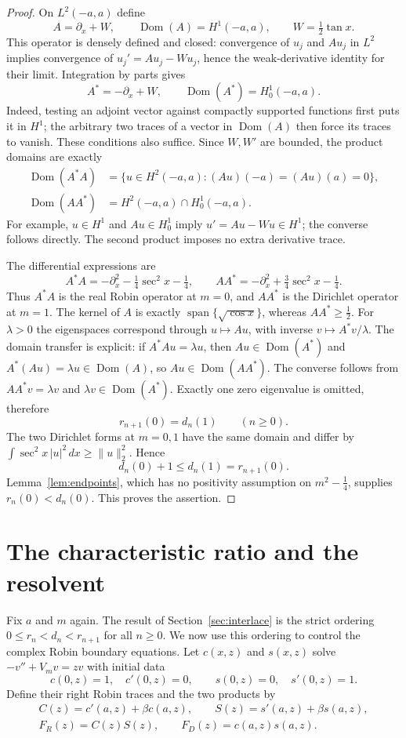 \documentclass[11pt]{article}
\newcommand{\norm}[1]{\lVert#1\rVert}
\DeclareMathOperator{\Dom}{Dom}
\begin{document}
\begin{proof}
On $L^2(-a,a)$ define
\[
 A=\partial_x+W,\qquad\Dom(A)=H^1(-a,a),\qquad W=\tfrac12\tan x.
\]
This operator is densely defined and closed: convergence of $u_j$ and
$Au_j$ in $L^2$ implies convergence of $u_j'=Au_j-Wu_j$, hence the
weak-derivative identity for their limit. Integration by parts gives
\[
 A^*=-\partial_x+W,\qquad\Dom(A^*)=H^1_0(-a,a).
\]
Indeed, testing an adjoint vector against compactly supported functions
first puts it in $H^1$; the arbitrary two traces of a vector in
$\Dom(A)$ then force its traces to vanish. These conditions also suffice.
Since $W,W'$ are bounded, the product domains are exactly
\begin{align*}
 \Dom(A^*A)&=\{u\in H^2(-a,a):(Au)(-a)=(Au)(a)=0\},\\
 \Dom(AA^*)&=H^2(-a,a)\cap H^1_0(-a,a).
\end{align*}
For example, $u\in H^1$ and $Au\in H^1_0$ imply
$u'=Au-Wu\in H^1$; the converse follows directly. The second product
imposes no extra derivative trace.

The differential expressions are
\[
 A^*A=-\partial_x^2-\tfrac14\sec^2x-\tfrac14,\qquad
 AA^*=-\partial_x^2+\tfrac34\sec^2x-\tfrac14.
\]
Thus $A^*A$ is the real Robin operator at $m=0$, and $AA^*$ is the
Dirichlet operator at $m=1$. The kernel of $A$ is exactly
$\operatorname{span}\{\sqrt{\cos x}\}$, whereas $AA^*\geq\tfrac12$.
For $\lambda>0$ the eigenspaces correspond through $u\mapsto Au$,
with inverse $v\mapsto A^*v/\lambda$. The domain transfer is explicit:
if $A^*Au=\lambda u$, then $Au\in\Dom(A^*)$ and
$A^*(Au)=\lambda u\in\Dom(A)$, so $Au\in\Dom(AA^*)$.
The converse follows from $AA^*v=\lambda v$ and
$\lambda v\in\Dom(A^*)$. Exactly one zero eigenvalue is omitted,
therefore
\[
 r_{n+1}(0)=d_n(1)\qquad(n\geq0).
\]
The two Dirichlet forms at $m=0,1$ have the same domain and differ by
$\int\sec^2x\,|u|^2\,dx\geq\norm{u}_2^2$. Hence
\[
 d_n(0)+1\leq d_n(1)=r_{n+1}(0).
\]
Lemma~\ref{lem:endpoints}, which has no positivity assumption on
$m^2-\tfrac14$, supplies $r_n(0)<d_n(0)$. This proves the assertion.
\end{proof}

\section{The characteristic ratio and the resolvent}\label{sec:resolvent}

Fix $a$ and $m$ again. The result of Section~\ref{sec:interlace} is the
strict ordering $0\leq r_n<d_n<r_{n+1}$ for all $n\geq0$.
We now use this ordering to control the complex Robin boundary equations.
Let $c(x,z)$ and $s(x,z)$ solve $-v''+V_mv=zv$ with initial data
\[
 c(0,z)=1,\quad c'(0,z)=0,\qquad s(0,z)=0,\quad s'(0,z)=1.
\]
Define their right Robin traces and the two products by
\[
 \begin{gathered}
 C(z)=c'(a,z)+\beta c(a,z),\qquad
 S(z)=s'(a,z)+\beta s(a,z),\\
 F_R(z)=C(z)S(z),\qquad F_D(z)=c(a,z)s(a,z).
 \end{gathered}
\]
\end{document}
